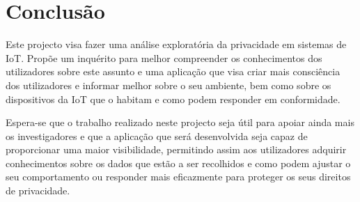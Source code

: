 \documentclass[conference]{IEEEtran}
\begin{document}

\section{Conclusão}

Este projecto visa fazer uma análise exploratória da privacidade em sistemas
de IoT. Propõe um inquérito para melhor compreender os conhecimentos dos utilizadores
sobre este assunto e uma aplicação que visa criar mais consciência dos utilizadores
e informar melhor sobre o seu ambiente, bem como sobre os dispositivos da IoT
que o habitam e como podem responder em conformidade.


Espera-se que o trabalho realizado neste projecto seja útil para apoiar ainda
mais os investigadores e que a aplicação que será desenvolvida seja capaz de proporcionar
uma maior visibilidade, permitindo assim aos utilizadores adquirir conhecimentos
sobre os dados que estão a ser recolhidos e como podem ajustar o seu comportamento
ou responder mais eficazmente para proteger os seus direitos de privacidade.




\end{document}
